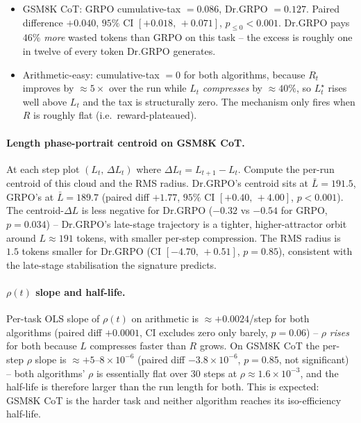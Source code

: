 \documentclass{article}
\begin{document}
\begin{itemize}
\item GSM8K CoT: GRPO cumulative-tax $= 0.086$, Dr.GRPO $= 0.127$.
      Paired difference $+0.040$, $95\%$ CI $[+0.018,\, +0.071]$,
      $p_{\le 0} < 0.001$. Dr.GRPO pays $46\%$ \emph{more} wasted
      tokens than GRPO on this task -- the excess is roughly one in
      twelve of every token Dr.GRPO generates.
\item Arithmetic-easy: cumulative-tax $= 0$ for both algorithms, because
      $R_t$ improves by $\approx 5\times$ over the run while $L_t$
      \emph{compresses} by $\approx 40\%$, so $L^\star_t$ rises well
      above $L_t$ and the tax is structurally zero. The mechanism
      only fires when $R$ is roughly flat (i.e.\ reward-plateaued).
\end{itemize}

\paragraph{Length phase-portrait centroid on GSM8K CoT.}
At each step plot $(L_t,\, \Delta L_t)$ where $\Delta L_t = L_{t+1} - L_t$.
Compute the per-run centroid of this cloud and the RMS radius. Dr.GRPO's
centroid sits at $\bar L = 191.5$, GRPO's at $\bar L = 189.7$ (paired
diff $+1.77$, $95\%$ CI $[+0.40,\, +4.00]$, $p < 0.001$). The
centroid-$\Delta L$ is less negative for Dr.GRPO ($-0.32$ vs $-0.54$
for GRPO, $p = 0.034$) -- Dr.GRPO's late-stage trajectory is a tighter,
higher-attractor orbit around $L \approx 191$ tokens, with smaller
per-step compression. The RMS radius is $1.5$ tokens smaller for
Dr.GRPO (CI $[-4.70,\, +0.51]$, $p = 0.85$), consistent with the
late-stage stabilisation the signature predicts.

\paragraph{$\rho(t)$ slope and half-life.}
Per-task OLS slope of $\rho(t)$ on arithmetic is $\approx +0.0024$/step for
both algorithms (paired diff $+0.0001$, CI excludes zero only barely,
$p = 0.06$) -- $\rho$ \emph{rises} for both because $L$ compresses
faster than $R$ grows. On GSM8K CoT the per-step $\rho$ slope is
$\approx +5$--$8 \times 10^{-6}$ (paired diff $-3.8 \times 10^{-6}$,
$p = 0.85$, not significant) -- both algorithms' $\rho$ is essentially
flat over 30 steps at $\rho \approx 1.6 \times 10^{-3}$, and the
half-life is therefore larger than the run length for both. This is
expected: GSM8K CoT is the harder task and neither algorithm reaches
its iso-efficiency half-life.
\end{document}

